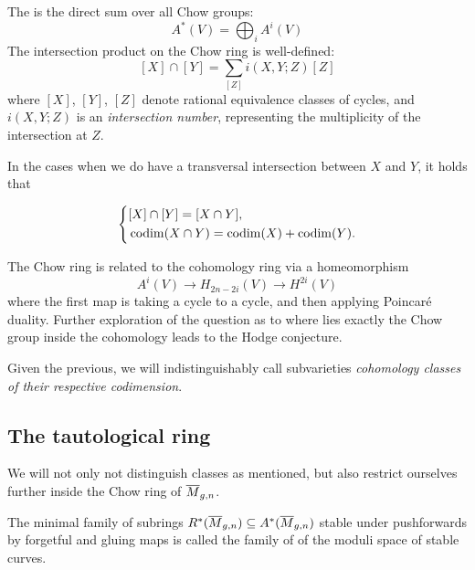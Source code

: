 \documentclass[12pt]{memoir}
\begin{document}
The  is the direct sum over all Chow groups:
$$A^\ast(V) = \bigoplus_i A^i(V)$$
The intersection product on the Chow ring is well-defined:
$$[X] \cap [Y] = \sum_{[Z]} i(X, Y; Z) [Z]$$
where $[X]$, $[Y]$, $[Z]$ denote rational equivalence classes of cycles, and $i(X, Y; Z)$ is an \emph{intersection number}, representing the multiplicity of the intersection at $Z$.

\begin{Rmk}
In the cases when we do have a transversal intersection between $X$ and $Y$, it holds that 

$$
\left\lbrace
\begin{aligned}
&[X]\cap[Y]=[X\cap Y],\\
&\operatorname{codim}(X\cap Y)=\operatorname{codim}(X)+\operatorname{codim}(Y).
\end{aligned}
\right.
$$

\end{Rmk}

\begin{Rmk}
    The Chow ring is related to the cohomology ring via a homeomorphism 
    $$A^i(V)\to H_{2n-2i}(V)\to H^{2i}(V)$$
    where the first map is taking a cycle to a cycle, and then applying Poincaré duality. Further exploration of the question as to where lies exactly the Chow group inside the cohomology leads to the Hodge conjecture.
\end{Rmk}

Given the previous, we will indistinguishably call subvarieties \emph{cohomology classes of their respective codimension}.

\subsection{The tautological ring}

We will not only not distinguish classes as mentioned, but also restrict ourselves further inside the Chow ring of $\overline M_{g,n}$. 

\begin{Def}
The minimal family of subrings $R^\ast(\overline M_{g,n})\subseteq A^\ast(\overline M_{g,n})$ stable under pushforwards by forgetful and gluing maps is called the family of  of the moduli space of stable curves.
\end{Def}

\end{document}
